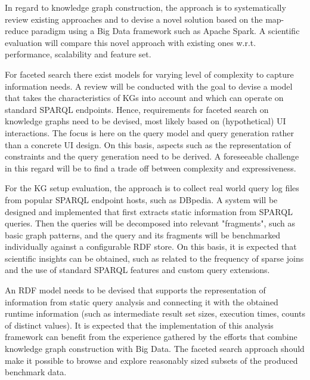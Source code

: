 In regard to knowledge graph construction, the approach is to systematically review existing approaches and to devise a novel solution based on the map-reduce paradigm using a Big Data framework such as Apache Spark.
A scientific evaluation will compare this novel approach with existing ones w.r.t. performance, scalability and feature set.

For faceted search there exist models for varying level of complexity to capture information needs.
A review will be conducted with the goal to devise a model that takes the characteristics of KGs into account and which can operate on standard SPARQL endpoints.
Hence, requirements for faceted search on knowledge graphs need to be devised, most likely based on (hypothetical) UI interactions. The focus is here on the query model and query generation rather than a concrete UI design. On this basis, aspects such as the representation of constraints and the query generation need to be derived.
A foreseeable challenge in this regard will be to find a trade off between complexity and expressiveness.

For the KG setup evaluation, the approach is to collect real world query log files from popular SPARQL endpoint hosts, such as DBpedia.
A system will be designed and implemented that first extracts static information from SPARQL queries.
Then the queries will be decomposed into relevant "fragments", such as basic graph patterns, and the query and its fragments will be benchmarked individually against a configurable RDF store.
On this basis, it is expected that scientific insights can be obtained, such as related to the frequency of sparse joins and the use of standard SPARQL features and custom query extensions.

An RDF model needs to be devised that supports the representation of information from static query analysis and connecting it with the obtained runtime information (such as intermediate result set sizes, execution times, counts of distinct values).
It is expected that the implementation of this analysis framework can benefit from the experience gathered by the efforts that combine knowledge graph construction with Big Data.
The faceted search approach should make it possible to browse and explore reasonably sized subsets of the produced benchmark data.


